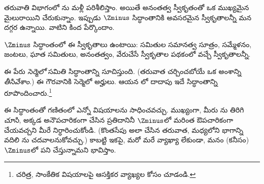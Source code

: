 \documentclass[../../../include/open-logic-section]{subfiles}
\begin{document}

తరువాతి విభాగంలో
\stagesinf{}ను మళ్లీ
పరిశీలిస్తాం. అయితే
అనంతత్వ స్వీకృతంతో
ఒక ముఖ్యమైన మైలురాయిని
చేరుకున్నాం. ఇప్పుడు
$\Zminus$ సిద్ధాంతానికి
అవసరమైన స్వీకృతాలన్నీ మన దగ్గర ఉన్నాయి.
వాటిని కింద పేర్కొందాం.

\begin{defn}
$\Zminus$ సిద్ధాంతంలో ఈ
స్వీకృతాలు ఉంటాయి:
సమితుల సమానత్వ సూత్రం,
సమ్మేళనం, జంటలు,
ఘాత సమితులు, అనంతత్వం,
వేరుచేసే స్వీకృతాల పథకంలో
వచ్చే స్వీకృతాలన్నీ.
\end{defn}

ఈ పేరు \emph{సెర్మెలో}
సమితి సిద్ధాంతాన్ని
సూచిస్తుంది. (తరువాత
చర్చించబోయే ఒక అంశాన్ని
\emph{తీసివేశాం}.)
ఈ గౌరవానికి సెర్మెలో అర్హులు. ఆయన
\citeyear{Zermelo1908Untersuchungen}లో
దాదాపు ఇదే సిద్ధాంతాన్ని రూపొందించారు.\footnote{చరిత్ర,
సాంకేతిక విషయాలపై
ఆసక్తికర వ్యాఖ్యల కోసం
\citet[Appendix
A]{Potter2004} చూడండి.}

ఈ సిద్ధాంతంతో గణితంలో ఎన్నో విషయాలను సాధించవచ్చు. ముఖ్యంగా,
మీరు ను
తిరిగి \emph{చూసి}, అక్కడ
అనౌపచారికంగా చేసిన
ప్రతిదానినీ $\Zminus$లో
మరింత ఔపచారికంగా
చేయవచ్చని మీరే
నిర్ధారించుకోండి. (కొంతసేపు
అలా చేసిన తరువాత,
మధ్యలోని భాగాన్ని వదిలి
ను
చదవాలనుకోవచ్చు.)
కాబట్టి ఇకపై, మరో
మరే వ్యాఖ్యా లేకుండా, మనం
(కనీసం) $\Zminus$లో
పని చేస్తున్నామని
భావిస్తాం.
\end{document}

